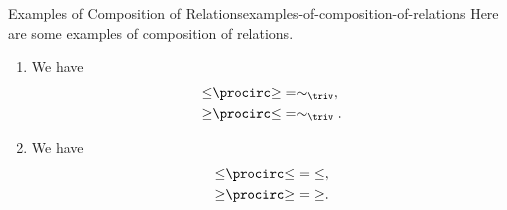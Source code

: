 \begin{example}{Examples of Composition of Relations}{examples-of-composition-of-relations}%
    Here are some examples of composition of relations.
    \begin{enumerate}
        \item{}We have
            \begin{align*}
                \mathord{\leq}\procirc\mathord{\geq} &= \sim_{\triv},\\
                \mathord{\geq}\procirc\mathord{\leq} &= \sim_{\triv}.
            \end{align*}
        \item{}We have
            \begin{align*}
                \mathord{\leq}\procirc\mathord{\leq} &= \mathord{\leq},\\
                \mathord{\geq}\procirc\mathord{\geq} &= \mathord{\geq}.
            \end{align*}
    \end{enumerate}
\end{example}
